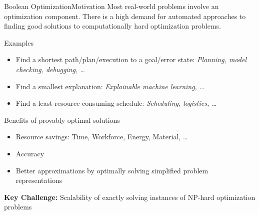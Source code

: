 \documentclass[t,english]{sdqbeamer}
\begin{document}
\begin{frame}{Boolean Optimization}{Motivation}
Most real-world problems involve an optimization component. There is a high demand for automated approaches to finding good solutions to computationally hard optimization problems.\\[1ex]
\begin{block}{Examples}
\begin{itemize}\itemsep1em
	\item Find a shortest path/plan/execution to a goal/error state: \emph{Planning, model checking, debugging, \dots}
	\item Find a smallest explanation: \emph{Explainable machine learning, \dots}
	\item Find a least resource-consuming schedule: \emph{Scheduling, logistics, \dots}
\end{itemize}
\end{block}
\begin{block}{Benefits of provably optimal solutions}
\begin{itemize}\itemsep1em
  \item Resource savings: Time, Workforce, Energy, Material, \dots
  \item Accuracy
  \item Better approximations by optimally solving simplified problem representations
\end{itemize}
\end{block}
\textbf{Key Challenge:} Scalability of exactly solving instances of NP-hard optimization problems
\end{frame}
\end{document}
